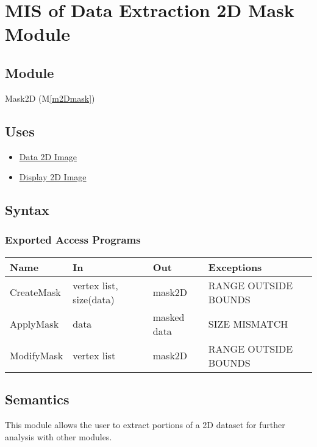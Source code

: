 \documentclass[12pt, titlepage]{article}
\newcommand{\mref}[1]{M\ref{#1}}
\begin{document}
\section{MIS of Data Extraction 2D Mask Module} \label{Mod:Mask2D}

\subsection{Module}

Mask2D (\mref{m2Dmask})

\subsection{Uses}
\begin{itemize}
    \item \hyperref[Mod:Image]{Data 2D Image}
    \item \hyperref[Mod:Disp2D]{Display 2D Image}
\end{itemize}

\subsection{Syntax}

\subsubsection{Exported Access Programs}

\begin{center}
    \begin{tabular}{p{3cm} p{4cm} p{4cm} p{3cm}}
        \hline
        \textbf{Name} & \textbf{In} & \textbf{Out} & \textbf{Exceptions} \\
        \hline
        CreateMask & vertex list, size(data) & mask2D & RANGE OUTSIDE BOUNDS \\
        ApplyMask & data & masked data & SIZE MISMATCH\\
        ModifyMask & vertex list & mask2D & RANGE OUTSIDE BOUNDS \\
        \hline
    \end{tabular}
\end{center}

\subsection{Semantics}
This module allows the user to extract portions of a 2D dataset for further
analysis with other modules.
\end{document}
